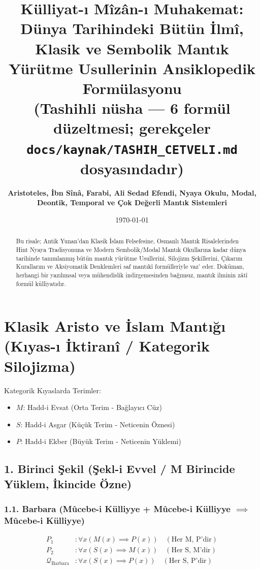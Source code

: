 \documentclass[11pt, a4paper]{article}
\title{\textbf{Külliyat-ı Mîzân-ı Muhakemat: Dünya Tarihindeki Bütün İlmî, Klasik ve Sembolik Mantık Yürütme Usullerinin Ansiklopedik Formülasyonu}\\ \normalsize\textmd{(Tashihli nüsha --- 6 formül düzeltmesi; gerekçeler \texttt{docs/kaynak/TASHIH\_CETVELI.md} dosyasındadır)}}
\author{\textbf{Aristoteles, İbn Sînâ, Farabi, Ali Sedad Efendi, Nyaya Okulu, Modal, Deontik, Temporal ve Çok Değerli Mantık Sistemleri}}
\date{\today}
\begin{document}
\maketitle

\begin{abstract}
Bu risale; Antik Yunan'dan Klasik İslam Felsefesine, Osmanlı Mantık Risalelerinden Hint Nyaya Tradisyonuna ve Modern Sembolik/Modal Mantık Okullarına kadar dünya tarihinde tanımlanmış bütün mantık yürütme Usullerini, Silojizm Şekillerini, Çıkarım Kurallarını ve Aksiyomatik Denklemleri saf mantıkî formülleriyle vaz' eder. Doküman, herhangi bir yazılımsal veya mühendislik indirgemesinden bağımsız, mantık ilminin zâtî formül külliyatıdır.
\end{abstract}

\tableofcontents
\newpage

\section{Klasik Aristo ve İslam Mantığı (Kıyas-ı İktiranî / Kategorik Silojizma)}

Kategorik Kıyaslarda Terimler:
\begin{itemize}
    \item $M$: Hadd-i Evsat (Orta Terim - Bağlayıcı Cüz)
    \item $S$: Hadd-i Asgar (Küçük Terim - Neticenin Öznesi)
    \item $P$: Hadd-i Ekber (Büyük Terim - Neticenin Yüklemi)
\end{itemize}

\subsection{1. Birinci Şekil (Şekl-i Evvel / M Birincide Yüklem, İkincide Özne)}

\subsubsection{1.1. Barbara (Mûcebe-i Külliyye + Mûcebe-i Külliyye $\implies$ Mûcebe-i Külliyye)}
\begin{align}
P_1 &: \forall x (M(x) \implies P(x)) \quad (\text{Her M, P'dir}) \\
P_2 &: \forall x (S(x) \implies M(x)) \quad (\text{Her S, M'dir}) \\
\mathcal{Q}_{\text{Barbara}} &: \forall x (S(x) \implies P(x)) \quad (\text{Her S, P'dir})
\end{align}
\end{document}
